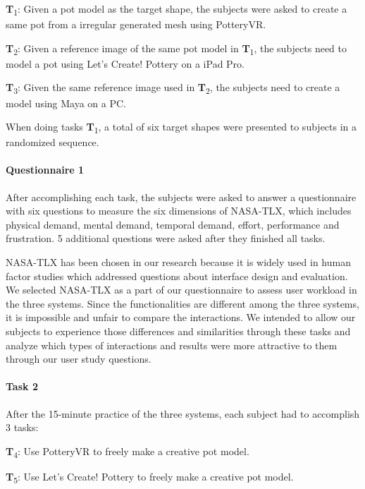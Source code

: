 \textbf{T}\textsubscript{1}: Given a pot model as the target shape, the subjects were asked to create a same pot from a irregular generated mesh using PotteryVR. 

\textbf{T}\textsubscript{2}: Given a reference image of the same pot model in \textbf{T}\textsubscript{1}, the subjects need to model a pot using Let's Create! Pottery on a iPad Pro.

\textbf{T}\textsubscript{3}: Given the same reference image used in \textbf{T}\textsubscript{2}, the subjects need to create a model using Maya on a PC.


When doing tasks \textbf{T}\textsubscript{1}, a total of six target shapes were presented to subjects in a randomized sequence.

\paragraph{Questionnaire 1} After accomplishing each task, the subjects were asked to answer a questionnaire with six questions to measure the six dimensions of NASA-TLX, which includes physical demand, mental demand, temporal demand, effort, performance and frustration. 5 additional questions were asked after they finished all tasks.

NASA-TLX has been chosen in our research because it is widely used in human factor studies which addressed questions about interface design and evaluation.\cite{hart2006nasa} We selected NASA-TLX as a part of our questionnaire to assess user workload in the three systems. Since the functionalities are different among the three systems, it is impossible and unfair to compare the interactions. We intended to allow our subjects to experience those differences and similarities through these tasks and analyze which types of interactions and results were more attractive to them through our user study questions.

\paragraph{Task 2} After the 15-minute practice of the three systems, each subject had to accomplish 3 tasks:

\textbf{T}\textsubscript{4}: Use PotteryVR to freely make a creative pot model.

\textbf{T}\textsubscript{5}: Use Let's Create! Pottery to freely make a creative pot model.

